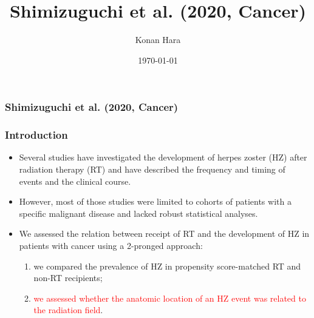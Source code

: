 \documentclass[aspectratio=169, 12pt]{beamer}
\title[Shimizuguchi et al. (2020, Cancer)]{Shimizuguchi et al. (2020, Cancer)}
\author[Konan Hara]{Konan Hara}
\institute[Arizona]{University of Arizona}
\date{\today}
\begin{document}

	\begin{frame}
	\frametitle{Shimizuguchi et al. (2020, Cancer)}
	\end{frame}

	\begin{frame}
	\frametitle{Introduction}
	\begin{itemize}
	\item Several studies have investigated the development of herpes zoster (HZ) after radiation therapy (RT) and have described the frequency and timing of events and the clinical course.
	\item However, most of those studies were limited to cohorts of patients with a specific malignant disease and lacked robust statistical analyses.
	\item We assessed the relation between receipt of RT and the development of HZ in patients with cancer using a 2-pronged approach:
	\begin{enumerate}
	\item we compared the prevalence of HZ in propensity score-matched RT and non-RT recipients;
	\item \textcolor{red}{we assessed whether the anatomic location of an HZ event was related to the radiation field}.
	\end{enumerate}

	\end{itemize}
	\end{frame}
\end{document}
